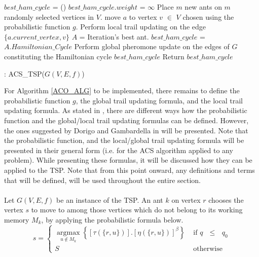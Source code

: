 \documentclass[12pt]{article}
\numberwithin{equation}{subsection}
\numberwithin{table}{subsection}
\numberwithin{algorithm}{subsection}
\numberwithin{figure}{subsection}
\DeclareMathOperator*{\argmax}{argmax}
\begin{document}
\begin{algorithm}[H]
\begin{algorithmic}[1]
\State $best\_ham\_cycle$ = ()
\State $best\_ham\_cycle.weight$ = $\infty$
          \State Place $m$ new ants on $m$ randomly selected vertices in $V$.
			\State move $a$ to vertex $v$ $\in$ $V$ chosen using the probabilistic function $g$.
			\State Perform local trail updating on the edge $\{a.current\_vertex, v\}$
		\EndFor
	\EndWhile
	\State $A$ = Iteration's best ant.
		\State $best\_ham\_cycle$ = $A.Hamiltonian\_Cycle$
	\EndIf
           \State Perform global pheromone update on the edges of $G$ constituting the Hamiltonian cycle $best\_ham\_cycle$
\EndWhile
\State Return $best\_ham\_cycle$
\caption{: ACS\_TSP($G(V,E,f)$)}
\label{ACO_ALG}
\end{algorithmic}
\end{algorithm}
For Algorithm \ref{ACO_ALG} to be implemented, there remains to define the probabilistic function $g$, the global trail updating formula, and the local trail updating formula. As stated in \cite{dorigo_gambardella_1997}, there are different ways how the probabilistic function and the global/local trail updating formulas can be defined. However, the ones suggested by Dorigo and Gambardella in \cite{dorigo_gambardella_1997} will be presented. Note that the probabilistic function, and the local/global trail updating formula will be presented in their general form (i.e. for the ACS algorithm applied to any problem). While presenting these formulas, it will be discussed how they can be applied to the TSP. Note that from this point onward, any definitions and terms that will be defined, will be used throughout the entire section. \\\\Let $G(V,E,f)$ be an instance of the TSP. An ant $k$ on vertex $r$ chooses the vertex $s$ to move to among those vertices which do not belong to its working memory $M_k$, by applying the probabilistic formula below.
\begin{equation}
  \label{eq:aco1}
  s=\begin{cases}
            \displaystyle{\argmax\limits_{u \notin M_k} \left\{[\tau(\{r,u\})].\left[\eta(\{r, u\})\right]^\beta \right\}} &\text{   if $q$ $\leq$ $q_0$}\\ 
             S &\text{ 	otherwise}
            \end{cases}
\end{equation}
\end{document}

